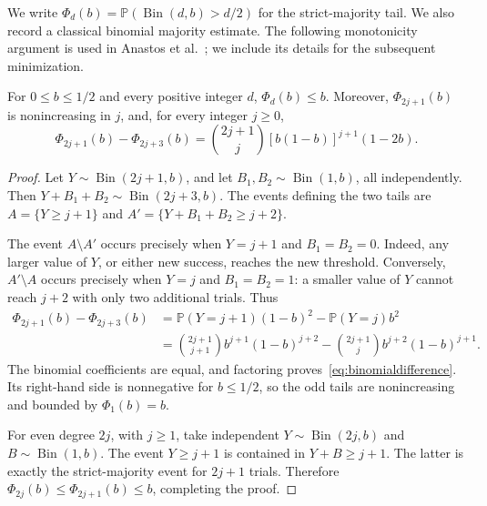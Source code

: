 \documentclass[12pt]{article}
\DeclareMathOperator{\Bin}{Bin}
\newcommand{\Pp}{\mathbb P}
\begin{document}
We write \(\Phi_d(b)=\Pp(\Bin(d,b)>d/2)\) for the strict-majority tail. We also record a classical binomial majority estimate. The following monotonicity argument is used in Anastos et al.~\cite[Proposition~19]{ALSS}; we include its details for the subsequent minimization.
\begin{lemma}\label{lem:binomial}
For \(0\le b\le1/2\) and every positive integer \(d\),
\(\Phi_d(b)\le b\).
Moreover, \(\Phi_{2j+1}(b)\) is nonincreasing in \(j\), and, for every integer \(j\ge0\),
\begin{equation}\label{eq:binomialdifference}
\Phi_{2j+1}(b)-\Phi_{2j+3}(b)
=\binom{2j+1}{j}[b(1-b)]^{j+1}(1-2b).
\end{equation}
\end{lemma}
\begin{proof}
Let \(Y\sim\Bin(2j+1,b)\), and let \(B_1,B_2\sim\Bin(1,b)\), all independently. Then \(Y+B_1+B_2\sim\Bin(2j+3,b)\). The events defining the two tails are \(A=\{Y\ge j+1\}\) and \(A'=\{Y+B_1+B_2\ge j+2\}\).

The event \(A\setminus A'\) occurs precisely when \(Y=j+1\) and \(B_1=B_2=0\). Indeed, any larger value of \(Y\), or either new success, reaches the new threshold. Conversely, \(A'\setminus A\) occurs precisely when \(Y=j\) and \(B_1=B_2=1\): a smaller value of \(Y\) cannot reach \(j+2\) with only two additional trials. Thus
\[
\begin{aligned}
\Phi_{2j+1}(b)-\Phi_{2j+3}(b)
&=\Pp(Y=j+1)(1-b)^2-\Pp(Y=j)b^2\\
&=\binom{2j+1}{j+1}b^{j+1}(1-b)^{j+2}
-\binom{2j+1}{j}b^{j+2}(1-b)^{j+1}.
\end{aligned}
\]
The binomial coefficients are equal, and factoring proves~\eqref{eq:binomialdifference}. Its right-hand side is nonnegative for \(b\le1/2\), so the odd tails are nonincreasing and bounded by \(\Phi_1(b)=b\).

For even degree \(2j\), with \(j\ge1\), take independent \(Y\sim\Bin(2j,b)\) and \(B\sim\Bin(1,b)\). The event \(Y\ge j+1\) is contained in \(Y+B\ge j+1\). The latter is exactly the strict-majority event for \(2j+1\) trials. Therefore \(\Phi_{2j}(b)\le\Phi_{2j+1}(b)\le b\), completing the proof.
\end{proof}

\end{document}
